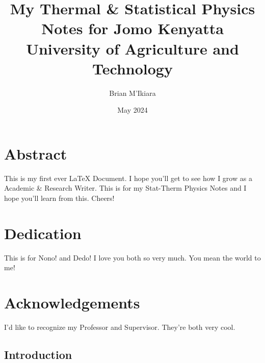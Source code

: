 \documentclass{article}
\title{My Thermal \& Statistical Physics Notes
{\Large} for Jomo Kenyatta University of Agriculture and Technology}
\author{Brian M'Ikiara}
\date{May 2024}
\begin{document}
    \maketitle
    \chapter*{Abstract}
    This is my first ever LaTeX Document. I hope you'll get to see how I grow
    as a Academic \& Research Writer. This is for my Stat-Therm Physics Notes
    and I hope you'll learn from this. Cheers!
    \chapter*{Dedication}
    This is for Nono! and Dedo!
    I love you both so very much.
    You mean the world to me!
    \chapter*{Acknowledgements}
    I'd like to recognize my Professor and Supervisor. They're both very cool.
    \tableofcontents
    \section{Introduction}
    \lipsum[1-20]
\end{document}
